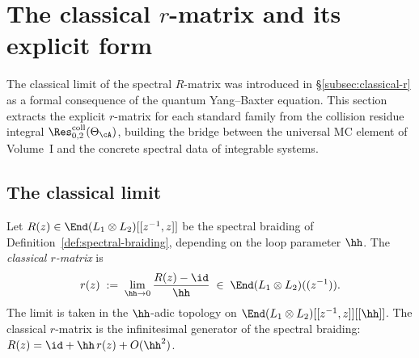 

\section{The classical $r$-matrix and its explicit form}

The classical limit of the spectral $R$-matrix was introduced in
\S\ref{subsec:classical-r} as a formal consequence of the quantum
Yang--Baxter equation. This section extracts the explicit $r$-matrix
for each standard family from the collision residue integral
$\Res^{\mathrm{coll}}_{0,2}(\Theta_\cA)$, building the bridge between
the universal MC element of Volume~I and the concrete spectral data of
integrable systems.

\subsection{The classical limit}

\begin{definition}
Let $R(z) \in \End(L_1 \otimes L_2)[[z^{-1}, z]]$ be the spectral
braiding of Definition~\ref{def:spectral-braiding}, depending on the
loop parameter $\hh$. The \emph{classical $r$-matrix} is
\begin{equation}
r(z) \;:=\; \lim_{\hh \to 0} \frac{R(z) - \id}{\hh}
\;\in\; \End(L_1 \otimes L_2)((z^{-1})).
\end{equation}
The limit is taken in the $\hh$-adic topology on
$\End(L_1 \otimes L_2)[[z^{-1}, z]][[\hh]]$. The classical
$r$-matrix is the infinitesimal generator of the spectral braiding:
$R(z) = \id + \hh\, r(z) + O(\hh^2)$.
\end{definition}

